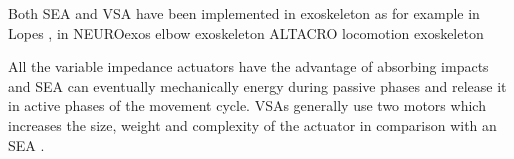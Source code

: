 \DIFaddend Both SEA and VSA have been implemented in exoskeleton as for example in Lopes \cite{veneman2007design},  \DIFdelbegin {}\DIFdelend in NEUROexos elbow exoskeleton \cite{vitiello2013neuroexos}\DIFdelbegin {}\DIFdelend \DIFaddbegin {}\DIFaddend ALTACRO locomotion exoskeleton \cite{cherelle2010maccepa}\DIFdelbegin {}%
\DIFdelend \DIFaddbegin {}

\DIFaddend All the variable impedance actuators have the advantage of absorbing impacts and SEA \DIFdelbegin {}\DIFdelend \DIFaddbegin {}\DIFaddend can eventually mechanically \DIFdelbegin {}\DIFdelend \DIFaddbegin {}\DIFaddend energy during passive phases and release it in active phases of the movement cycle.  \DIFdelbegin {}\DIFdelend VSAs generally use two motors which increases the size, weight and complexity of the actuator in comparison with an SEA \cite{wolf2011dlr}.

